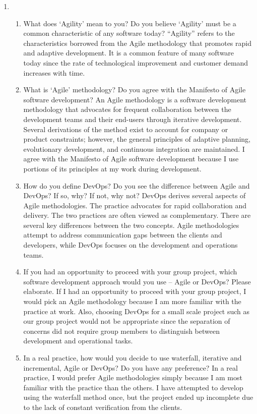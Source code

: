 \documentclass[12pt]{article}
\begin{document}
\begin{enumerate}
\begin{enumerate}[start=1,align=left]
    \end{enumerate}

    \item
    \begin{enumerate}[start=1,align=left]
      \item What does ‘Agility’ mean to you? Do you believe ‘Agility’ must be a common characteristic of any software today?
      ``Agility'' refers to the characteristics borrowed from the Agile methodology that promotes rapid and adaptive development. It is a common feature of many software today since the rate of technological improvement and customer demand increases with time.

      \item What is ‘Agile’ methodology? Do you agree with the Manifesto of Agile software development? 
      An Agile methodology is a software development methodology that advocates for frequent collaboration between the development teams and their end-users through iterative development. Several derivations of the method exist to account for company or product constraints; however, the general principles of adaptive planning, evolutionary development, and continuous integration are maintained. I agree with the Manifesto of Agile software development because I use portions of its principles at my work during development.

      \item How do you define DevOps? Do you see the difference between Agile and DevOps? If so, why? If not, why not?
      DevOps derives several aspects of Agile methodologies. The practice advocates for rapid collaboration and delivery. The two practices are often viewed as complementary. There are several key differences between the two concepts. Agile methodologies attempt to address communication gaps between the clients and developers, while DevOps focuses on the development and operations teams.

      \item If you had an opportunity to proceed with your group project, which software development approach would you use – Agile or DevOps? Please elaborate.
      If I had an opportunity to proceed with your group project, I would pick an Agile methodology because I am more familiar with the practice at work. Also, choosing DevOps for a small scale project such as our group project would not be appropriate since the separation of concerns did not require group members to distinguish between development and operational tasks.

      \item In a real practice, how would you decide to use waterfall, iterative and incremental, Agile or DevOps? Do you have any preference?
      In a real practice, I would prefer Agile methodologies simply because I am most familiar with the practice than the others. I have attempted to develop using the waterfall method once, but the project ended up incomplete due to the lack of constant verification from the clients.

    \end{enumerate}


  \end{enumerate}
\end{document}
